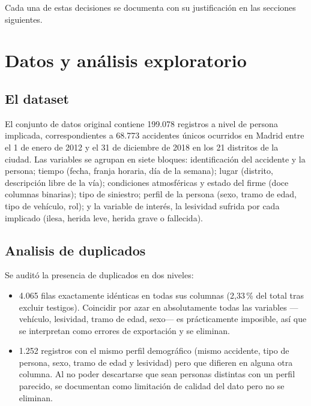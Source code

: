 \documentclass[11pt,a4paper]{article}
\begin{document}
Cada una de estas decisiones se documenta con su justificación en las secciones siguientes.

\section{Datos y análisis exploratorio}

\subsection{El dataset}

El conjunto de datos original contiene 199.078 registros a nivel de persona implicada, correspondientes a 68.773 accidentes únicos ocurridos en Madrid entre el 1 de enero de 2012 y el 31 de diciembre de 2018 en los 21 distritos de la ciudad. Las variables se agrupan en siete bloques: identificación del accidente y la persona; tiempo (fecha, franja horaria, día de la semana); lugar (distrito, descripción libre de la vía); condiciones atmosféricas y estado del firme (doce columnas binarias); tipo de siniestro; perfil de la persona (sexo, tramo de edad, tipo de vehículo, rol); y la variable de interés, la lesividad sufrida por cada implicado (ilesa, herida leve, herida grave o fallecida).

\subsection{Analisis de duplicados}

Se auditó la presencia de duplicados en dos niveles:

\begin{itemize}[nosep]
\item 4.065 filas exactamente idénticas en todas sus columnas (2,33\,\% del total tras excluir testigos). Coincidir por azar en absolutamente todas las variables --- vehículo, lesividad, tramo de edad, sexo--- es prácticamente imposible, así que se interpretan como errores de exportación y se eliminan.
\item 1.252 registros con el mismo perfil demográfico (mismo accidente, tipo de persona, sexo, tramo de edad y lesividad) pero que difieren en alguna otra columna. Al no poder descartarse que sean personas distintas con un perfil parecido, se documentan como limitación de calidad del dato pero no se eliminan.
\end{itemize}
\end{document}
